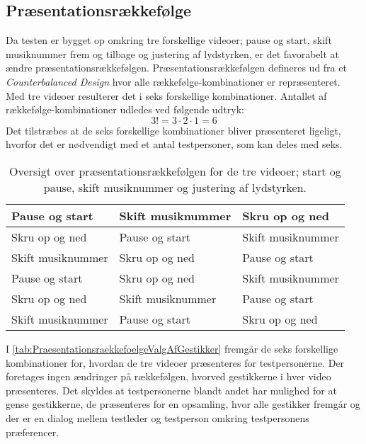 \subsection{Præsentationsrækkefølge}
\label{PraesentationsraekkefoelgeValgAfGestikker}
%
Da testen er bygget op omkring tre forskellige videoer; pause og start, skift musiknummer frem og tilbage og justering af lydstyrken, er det favorabelt at ændre præsentationsrækkefølgen. Præsentationsrækkefølgen defineres ud fra et \textit{Counterbalanced Design} hvor alle rækkefølge-kombinationer er repræsenteret. Med tre videoer resulterer det i seks forskellige kombinationer. Antallet af rækkefølge-kombinationer udledes ved følgende udtryk:
%
\begin{equation}
	3! = 3\cdot2\cdot1 = 6
\end{equation}
%
Det tilstræbes at de seks forskellige kombinationer bliver præsenteret ligeligt, hvorfor det er nødvendigt med et antal testpersoner, som kan deles med seks.
%
\begin{table}[H]
	\centering
	\begin{tabular}{ |  p{4cm}  |  p{4cm}  |  p{4cm}  |}
		\hline
		Pause og start & Skift musiknummer & Skru op og ned \\ \hline
		Skru op og ned & Pause og start & Skift musiknummer\\ \hline
		Skift musiknummer & Skru op og ned & Pause og start \\ \hline
		Pause og start & Skru op og ned & Skift musiknummer\\ \hline
		Skru op og ned & Skift musiknummer & Pause og start\\ \hline
		Skift musiknummer & Pause og start & Skru op og ned \\ \hline
	\end{tabular}
	\caption{Oversigt over præsentationsrækkefølgen for de tre videoer; start og pause, skift musiknummer og justering af lydstyrken.}
	\label{tab:PraesentationsraekkefoelgeValgAfGestikker}
\end{table}
\noindent
%
I \autoref{tab:PraesentationsraekkefoelgeValgAfGestikker} fremgår de seks forskellige kombinationer for, hvordan de tre videoer præsenteres for testpersonerne. Der foretages ingen ændringer på rækkefølgen, hvorved gestikkerne i hver video præsenteres. Det skyldes at testpersonerne blandt andet har mulighed for at gense gestikkerne, de præsenteres for en opsamling, hvor alle gestikker fremgår og der er en dialog mellem testleder og testperson omkring testpersonens præferencer.  
%
